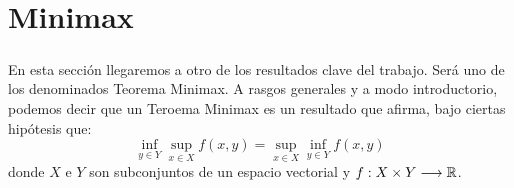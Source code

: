 \chapter{Minimax}
	\paragraph{}En esta sección llegaremos a otro de los resultados clave del trabajo. Será uno de los denominados Teorema Minimax. A rasgos generales y a modo introductorio, podemos decir que un Teroema Minimax es un resultado que afirma, bajo ciertas hipótesis que:
	\[
	\inf_{y \in Y} \sup_{x \in X} f(x,y) = \sup_{x \in X} \inf_{y \in Y} f(x,y)
	\] 
	donde $ X \text{ e } Y$ son subconjuntos de un espacio vectorial y $ f: X \times Y \longrightarrow \mathbb{R} $.